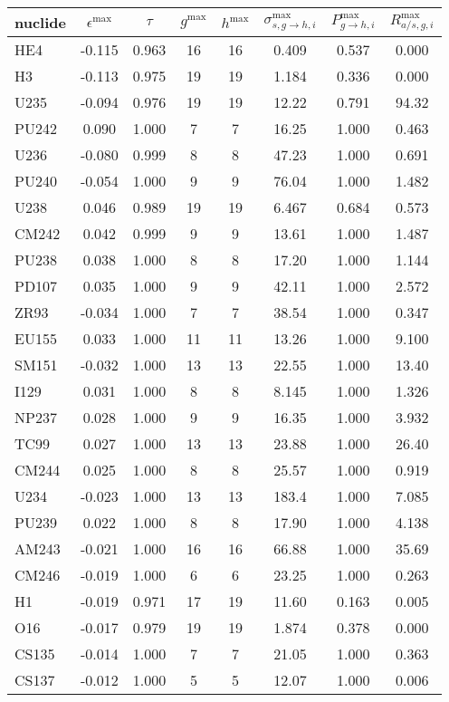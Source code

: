 \begin{tabular}{|l|ccccccc|}
\hline
nuclide & $\epsilon^{\max}$ & $\tau$ & $g^{\max}$ & $h^{\max}$ & $\sigma_{s,g\to h,i}^{\max}$ & $P_{g\to h,i}^{\max}$ & $R_{a/s,g,i}^{\max}$\\
\hline
HE4 & -0.115 & 0.963 & 16 & 16 & 0.409 & 0.537 & 0.000\\
H3 & -0.113 & 0.975 & 19 & 19 & 1.184 & 0.336 & 0.000\\
U235 & -0.094 & 0.976 & 19 & 19 & 12.22 & 0.791 & 94.32\\
PU242 & 0.090 & 1.000 & 7 & 7 & 16.25 & 1.000 & 0.463\\
U236 & -0.080 & 0.999 & 8 & 8 & 47.23 & 1.000 & 0.691\\
PU240 & -0.054 & 1.000 & 9 & 9 & 76.04 & 1.000 & 1.482\\
U238 & 0.046 & 0.989 & 19 & 19 & 6.467 & 0.684 & 0.573\\
CM242 & 0.042 & 0.999 & 9 & 9 & 13.61 & 1.000 & 1.487\\
PU238 & 0.038 & 1.000 & 8 & 8 & 17.20 & 1.000 & 1.144\\
PD107 & 0.035 & 1.000 & 9 & 9 & 42.11 & 1.000 & 2.572\\
ZR93 & -0.034 & 1.000 & 7 & 7 & 38.54 & 1.000 & 0.347\\
EU155 & 0.033 & 1.000 & 11 & 11 & 13.26 & 1.000 & 9.100\\
SM151 & -0.032 & 1.000 & 13 & 13 & 22.55 & 1.000 & 13.40\\
I129 & 0.031 & 1.000 & 8 & 8 & 8.145 & 1.000 & 1.326\\
NP237 & 0.028 & 1.000 & 9 & 9 & 16.35 & 1.000 & 3.932\\
TC99 & 0.027 & 1.000 & 13 & 13 & 23.88 & 1.000 & 26.40\\
CM244 & 0.025 & 1.000 & 8 & 8 & 25.57 & 1.000 & 0.919\\
U234 & -0.023 & 1.000 & 13 & 13 & 183.4 & 1.000 & 7.085\\
PU239 & 0.022 & 1.000 & 8 & 8 & 17.90 & 1.000 & 4.138\\
AM243 & -0.021 & 1.000 & 16 & 16 & 66.88 & 1.000 & 35.69\\
CM246 & -0.019 & 1.000 & 6 & 6 & 23.25 & 1.000 & 0.263\\
H1 & -0.019 & 0.971 & 17 & 19 & 11.60 & 0.163 & 0.005\\
O16 & -0.017 & 0.979 & 19 & 19 & 1.874 & 0.378 & 0.000\\
CS135 & -0.014 & 1.000 & 7 & 7 & 21.05 & 1.000 & 0.363\\
CS137 & -0.012 & 1.000 & 5 & 5 & 12.07 & 1.000 & 0.006\\

\end{tabular}
